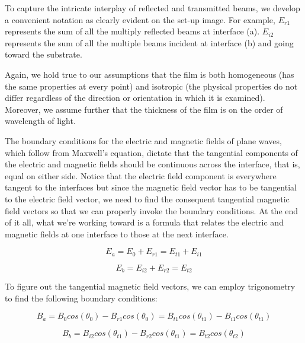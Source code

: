 To capture the intricate interplay of reflected and transmitted beams, we develop a convenient notation as clearly evident on the set-up image. For example, $E_{r1}$ represents the sum of all the multiply reflected beams at interface (a). $E_{i2}$ represents the sum of all the multiple beams incident at interface (b) and going toward the substrate.

Again, we hold true to our assumptions that the film is both homogeneous (has the same properties at every point) and isotropic (the physical properties do not differ regardless of the direction or orientation in which it is examined). Moreover, we assume further that the thickness of the film is on the order of wavelength of light.

The boundary conditions for the electric and magnetic fields of plane waves, which follow from Maxwell's equation, dictate that the tangential components of the electric and magnetic fields should be continuous across the interface, that is, equal on either side. Notice that the electric field component is everywhere tangent to the interfaces but since the magnetic field vector has to be tangential to the electric field vector, we need to find the consequent tangential magnetic field vectors so that we can properly invoke the boundary conditions. At the end of it all, what we're working toward is a formula that relates the electric and magnetic fields at one interface to those at the next interface.

\begin{equation} \label{E_a - Multilayer films electric field boundary equations}
E_a = E_0 + E_{r1} = E_{t1} + E_{i1}
\end{equation}

\begin{equation} \label{E_b - Multilayer films electric field boundary equations}
E_b = E_{i2} + E_{r2} = E_{t2}
\end{equation}

To figure out the tangential magnetic field vectors, we can employ trigonometry to find the following boundary conditions:

\begin{equation} \label{B_a - Multilayer films magnetic field boundary equations}
B_a = B_0cos(\theta_0) - B_{r1}cos(\theta_0) = B_{t1}cos(\theta_{t1}) - B_{i1}cos(\theta_{t1})
\end{equation}

\begin{equation} \label{B_b - Multilayer films magnetic field boundary equations}
B_b = B_{i2}cos(\theta_{t1}) - B_{r2}cos(\theta_{t1}) = B_{t2}cos(\theta_{t2})
\end{equation}

